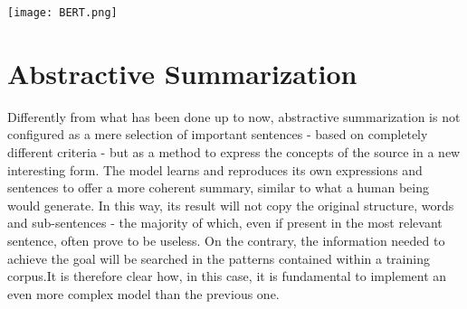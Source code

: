 \documentclass[fleqn,10pt]{SelfArx} %
\begin{document}
\par
{\centering\vspace{10pt}
\texttt{[image: BERT.png]}
\vspace{10pt}
\par}
\section{Abstractive Summarization}
Differently from what has been done up to now, abstractive summarization is not configured as a mere selection of important sentences - based on completely different criteria - but as a method to express the concepts of the source in a new interesting form. The model learns and reproduces its own expressions and sentences to offer a more coherent summary, similar to what a human being would generate. In this way, its result will not copy the original structure, words and sub-sentences - the majority of which, even if present in the most relevant sentence, often prove to be useless. On the contrary, the information needed to achieve the goal will be searched in the patterns contained within a training corpus.It is therefore clear how, in this case, it is fundamental to implement an even more complex model than the previous one.
\end{document}
